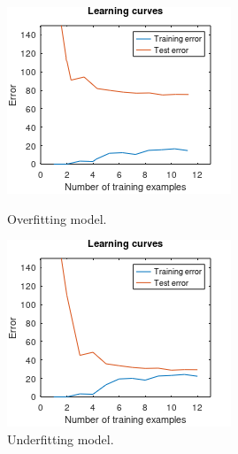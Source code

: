 \begin{figure}[h!]
  \centering
  \begin{minipage}[b]{0.45\textwidth}
    \includegraphics[width=\textwidth]{Images/Methods/Evaluation/overlc.png}
    \caption{Overfitting model.}
  \end{minipage}
  \hfill
  \begin{minipage}[b]{0.45\textwidth}
    \includegraphics[width=\textwidth]{Images/Methods/Evaluation/goodlc.png}
    \caption{Underfitting model.}
  \end{minipage}
\end{figure}\\

